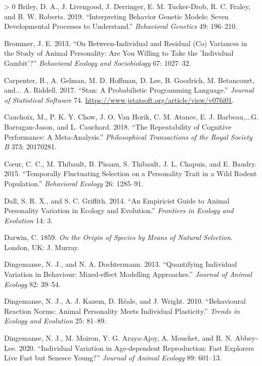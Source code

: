 \documentclass{article}
\newlength{\cslhangindent}
\newenvironment{CSLReferences}[3] %
 {%
  \setlength{\parindent}{0pt}
  \ifodd #1 \everypar{\setlength{\hangindent}{\cslhangindent}}\ignorespaces\fi
  \ifnum #2 > 0
  \setlength{\parskip}{#2\baselineskip}
  \fi
 }%
 {}
\begin{document}
\begin{CSLReferences}{1}{0}
\leavevmode\hypertarget{ref-Briley2019}{}%
Briley, D. A., J. Livengood, J. Derringer, E. M. Tucker-Drob, R. C.
Fraley, and B. W. Roberts. 2019. {``Interpreting Behavior Genetic
Models: Seven Developmental Processes to Understand.''} \emph{Behavioral
Genetics} 49: 196--210.

\leavevmode\hypertarget{ref-Brommer2013}{}%
Brommer, J. E. 2013. {``On Between-Individual and Residual (Co)
Variances in the Study of Animal Personality: Are You Willing to Take
the 'Individual Gambit'?''} \emph{Behavioral Ecology and Sociobiology}
67: 1027--32.

\leavevmode\hypertarget{ref-Stan}{}%
Carpenter, B., A. Gelman, M. D. Hoffman, D. Lee, B. Goodrich, M.
Betancourt, and... A. Riddell. 2017. {``Stan: A Probabilistic
Programming Language.''} \emph{Journal of Statistical Software} 74.
\url{https://www.jstatsoft.org/article/view/v076i01}.

\leavevmode\hypertarget{ref-Cauch2018}{}%
Cauchoix, M., P. K. Y. Chow, J. O. Van Horik, C. M. Atance, E. J.
Barbeau,...G. Barragan-Jason, and L. Cauchard. 2018. {``The
Repeatability of Cognitive Performance: A Meta-Analysis.''}
\emph{Philosophical Transactions of the Royal Society B} 373: 20170281.

\leavevmode\hypertarget{ref-LC2015}{}%
Cœur, C. C., M. Thibault, B. Pisanu, S. Thibault, J. L. Chapuis, and E.
Baudry. 2015. {``Temporally Fluctuating Selection on a Personality Trait
in a Wild Rodent Population.''} \emph{Behavioral Ecology} 26: 1285--91.

\leavevmode\hypertarget{ref-Dall2014}{}%
Dall, S. R. X., and S. C. Griffith. 2014. {``An Empiricist Guide to
Animal Personality Variation in Ecology and Evolution.''}
\emph{Frontiers in Ecology and Evolution} 14: 3.

\leavevmode\hypertarget{ref-Darwin}{}%
Darwin, C. 1859. \emph{On the Origin of Species by Means of Natural
Selection}. London, UK: J. Murray.

\leavevmode\hypertarget{ref-DingDocht2013}{}%
Dingemanse, N. J., and N. A. Dochtermann. 2013. {``Quantifying
Individual Variation in Behaviour: Mixed‐effect Modelling Approaches.''}
\emph{Journal of Animal Ecology} 82: 39--54.

\leavevmode\hypertarget{ref-Ding2010}{}%
Dingemanse, N. J., A. J. Kazem, D. Réale, and J. Wright. 2010.
{``Behavioural Reaction Norms: Animal Personality Meets Individual
Plasticity.''} \emph{Trends in Ecology and Evolution} 25: 81--89.

\leavevmode\hypertarget{ref-Ding2020b}{}%
Dingemanse, N. J., M. Moiron, Y. G. Araya‐Ajoy, A. Mouchet, and R. N.
Abbey‐Lee. 2020. {``Individual Variation in Age‐dependent Reproduction:
Fast Explorers Live Fast but Senesce Young?''} \emph{Journal of Animal
Ecology} 89: 601--13.


\end{CSLReferences}
\end{document}

